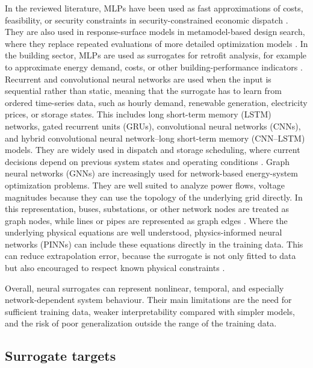 In the reviewed literature, MLPs have been used as fast approximations
of costs, feasibility, or security constraints in security-constrained
economic dispatch
\cite{Chen2022,Chen20244723,Wu2022231,Xu20223066,Guo20222057,Li202359995}.
They are also used in response-surface models in metamodel-based design
search, where they replace repeated evaluations of more detailed
optimization models
\cite{Hirvonen2017323,Jia2022553,Li2023,Wang2020202933}.
In the building sector, MLPs are used as surrogates for retrofit
analysis, for example to approximate energy demand, costs, or other
building-performance indicators
\cite{Thrampoulidis2021,Reynolds2017704,Koschwitz2018134}. Recurrent and
convolutional neural networks are used when the input is sequential
rather than static, meaning that the surrogate has to learn from ordered
time-series data, such as hourly demand, renewable generation,
electricity prices, or storage states. This includes long short-term
memory (LSTM) networks, gated recurrent units (GRUs), convolutional
neural networks (CNNs), and hybrid convolutional neural network--long
short-term memory (CNN--LSTM) models. They are widely used in dispatch
and storage scheduling, where current decisions depend on previous
system states and operating conditions
\cite{Rafi202132436,Sideratos2020,Li2019,Tian2020,Yang2020415,Wang2023,Shi2024,Lu20232989,Hanifi2024}.
Graph neural networks (GNNs) are increasingly used for network-based
energy-system optimization problems. They are well suited to analyze
power flows, voltage magnitudes because they can use the topology of the
underlying grid directly. In this representation, buses, substations, or
other network nodes are treated as graph nodes, while lines or pipes are
represented as graph edges
\cite{Park2019,Su2022315,Liu20223726,Chen2023657}. Where the
underlying physical equations are well understood, physics-informed
neural networks (PINNs) can include these equations directly in the
training data. This can reduce extrapolation error, because the
surrogate is not only fitted to data but also encouraged to respect
known physical constraints
\cite{Park2019,Su2022315,Liu20222679,Chen2023657}.

Overall, neural surrogates can represent nonlinear, temporal, and
especially network-dependent system behaviour. Their main limitations
are the need for sufficient training data, weaker interpretability
compared with simpler models, and the risk of poor generalization
outside the range of the training data.

\subsection{Surrogate targets}
\label{sec:tax:targets}

